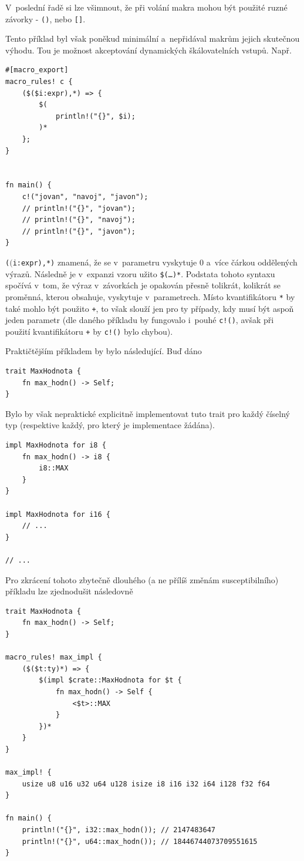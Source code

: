 \documentclass[a4paper, 12pt]{article} %
\newcommand{\rust}[1]{\texttt{#1}}
\begin{document}
            V~poslední řadě si lze všimnout, že při volání makra mohou být použité ruzné závorky - \rust{()}, \rust{{}} nebo \rust{[]}.
            
            Tento příklad byl však poněkud minimální a~nepřidával makrům jejich skutečnou výhodu. Tou je možnost akceptování dynamických škálovatelních vstupů. Např.
            \begin{verbatim}
#[macro_export]
macro_rules! c {
    ($($i:expr),*) => { 
        $(
            println!("{}", $i);
        )*
    };
}


fn main() {
    c!("jovan", "navoj", "javon");
    // println!("{}", "jovan");
    // println!("{}", "navoj");
    // println!("{}", "javon");
}
            \end{verbatim}
            
            \rust{($($i:expr),*)} znamená, že se v~parametru vyskytuje 0 a~více čárkou oddělených výrazů. Následně je v~expanzi vzoru užito \texttt{\$(\dots)*}. Podstata tohoto syntaxu spočívá v~tom, že výraz v~závorkách je opakován přesně tolikrát, kolikrát se proměnná, kterou obsahuje, vyskytuje v~parametrech. Místo kvantifikátoru \rust{*} by také mohlo být použito \rust{+}, to však slouží jen pro ty případy, kdy musí být aspoň jeden parametr (dle daného příkladu by fungovalo i~pouhé \rust{c!()}, avšak při použití kvantifikátoru \rust{+} by \rust{c!()} bylo chybou).
            
            Praktičtějším příkladem by bylo následující. Buď dáno
            \begin{verbatim}
trait MaxHodnota {
    fn max_hodn() -> Self;
}
            \end{verbatim}
            
            Bylo by však nepraktické explicitně implementovat tuto trait pro každý číselný typ (respektive každý, pro který je implementace žádána).
            \begin{verbatim}
impl MaxHodnota for i8 {
    fn max_hodn() -> i8 {
        i8::MAX
    }
}

impl MaxHodnota for i16 {
    // ...
}

// ...
            \end{verbatim}
            
            Pro zkrácení tohoto zbytečně dlouhého (a ne přílíš změnám susceptibilního) příkladu lze zjednodušit následovně
            \begin{verbatim}
trait MaxHodnota {
    fn max_hodn() -> Self;
}

macro_rules! max_impl {
    ($($t:ty)*) => {
        $(impl $crate::MaxHodnota for $t {
            fn max_hodn() -> Self {
                <$t>::MAX
            }
        })*
    }
}

max_impl! {
    usize u8 u16 u32 u64 u128 isize i8 i16 i32 i64 i128 f32 f64
}

fn main() {
    println!("{}", i32::max_hodn()); // 2147483647
    println!("{}", u64::max_hodn()); // 18446744073709551615
}
            \end{verbatim}
            
\end{document}
